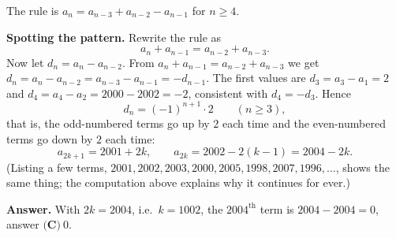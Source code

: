 The rule is $a_n=a_{n-3}+a_{n-2}-a_{n-1}$ for $n\ge4$.

\textbf{Spotting the pattern.} Rewrite the rule as
\[
a_n+a_{n-1}=a_{n-2}+a_{n-3}.
\]
Now let $d_n=a_n-a_{n-2}$. From $a_n+a_{n-1}=a_{n-2}+a_{n-3}$ we get $d_n=a_n-a_{n-2}=a_{n-3}-a_{n-1}=-d_{n-1}$. The first values are $d_3=a_3-a_1=2$ and $d_4=a_4-a_2=2000-2002=-2$, consistent with $d_4=-d_3$. Hence
\[
d_n=(-1)^{n+1}\cdot2\qquad(n\ge3),
\]
that is, the odd-numbered terms go up by $2$ each time and the even-numbered terms go down by $2$ each time:
\[
a_{2k+1}=2001+2k,\qquad a_{2k}=2002-2(k-1)=2004-2k .
\]
(Listing a few terms, $2001,2002,2003,2000,2005,1998,2007,1996,\dots$, shows the same thing; the computation above explains why it continues for ever.)

\textbf{Answer.} With $2k=2004$, i.e.\ $k=1002$, the $2004^\text{th}$ term is $2004-2004=0$, answer $\boxed{\textbf{(C)}\ 0}$.

